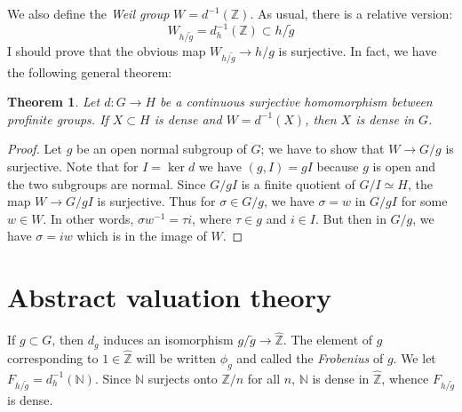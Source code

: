 \documentclass{article}
\newcommand{\bb}{\mathbb}
\newcommand{\frob}{F}
\newcommand{\hZ}{\hat{\mathbb{Z}}}
\newtheorem{theorem}{Theorem}
\begin{document}
We also define the \emph{Weil group} $W=d^{-1}(\bb Z)$. As usual, there is a 
relative version:
\[
  W_{h/\tilde g} = d_h^{-1}(\bb Z) \subset h/\tilde g
\]
I should prove that the obvious map $W_{h/\tilde g} \to h/g$ is surjective. In 
fact, we have the following general theorem:

\begin{theorem}
Let $d:G\to H$ be a continuous surjective homomorphism between profinite 
groups. If $X\subset H$ is dense and $W=d^{-1}(X)$, then $X$ is dense in $G$. 
\end{theorem}
\begin{proof}
Let $g$ be an open normal subgroup of $G$; we have to show that $W\to G/g$ is 
surjective. Note that for $I=\ker d$ we have $(g,I) = g I$ because $g$ is open 
and the two subgroups are normal. Since $G/g I$ is a finite quotient of 
$G/I\simeq H$, the map $W\to G/g I$ is surjective. Thus for $\sigma\in G/g$, 
we have $\sigma = w$ in $G/g I$ for some $w\in W$. In other words, 
$\sigma w^{-1} = \tau i$, where $\tau\in g$ and $i\in I$. But then in $G/g$, 
we have $\sigma = iw$ which is in the image of $W$. 
\end{proof}





\section{Abstract valuation theory}

If $g\subset G$, then $d_g$ induces an isomorphism $g/\tilde g \to \hZ$. The 
element of $g$ corresponding to $1\in \hZ$ will be written $\phi_g$ and called 
the \emph{Frobenius} of $g$. We let $\frob_{h/\tilde g} = d_h^{-1}(\bb N)$. 
Since $\bb N$ surjects onto $\bb Z/n$ for all $n$, $\bb N$ is dense in $\hZ$, 
whence $\frob_{h/\tilde g}$ is dense. 
\end{document}
